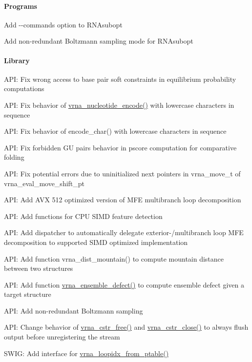 \paragraph*{Programs}


\begin{DoxyItemize}
\item Add {\ttfamily -\/-\/commands} option to {\ttfamily R\+N\+Asubopt}
\item Add non-\/redundant Boltzmann sampling mode for {\ttfamily R\+N\+Asubopt}
\end{DoxyItemize}

\paragraph*{Library}


\begin{DoxyItemize}
\item A\+PI\+: Fix wrong access to base pair soft constraints in equilibrium probability computations
\item A\+PI\+: Fix behavior of {\ttfamily \mbox{\hyperlink{group__alphabet__utils_gac12bf00123f88621c9be847b0879c1fb}{vrna\+\_\+nucleotide\+\_\+encode()}}} with lowercase characters in sequence
\item A\+PI\+: Fix behavior of {\ttfamily encode\+\_\+char()} with lowercase characters in sequence
\item A\+PI\+: Fix forbidden {\ttfamily GU} pairs behavior in pscore computation for comparative folding
\item A\+PI\+: Fix potential errors due to uninitialized {\ttfamily next} pointers in {\ttfamily vrna\+\_\+move\+\_\+t} of {\ttfamily vrna\+\_\+eval\+\_\+move\+\_\+shift\+\_\+pt}
\item A\+PI\+: Add {\ttfamily A\+VX 512} optimized version of M\+FE multibranch loop decomposition
\item A\+PI\+: Add functions for C\+PU S\+I\+MD feature detection
\item A\+PI\+: Add dispatcher to automatically delegate exterior-\//multibranch loop M\+FE decomposition to supported S\+I\+MD optimized implementation
\item A\+PI\+: Add function {\ttfamily vrna\+\_\+dist\+\_\+mountain()} to compute mountain distance between two structures
\item A\+PI\+: Add function {\ttfamily \mbox{\hyperlink{group__part__func__global_gaaf197722d1faa86af5e7b4240acafdee}{vrna\+\_\+ensemble\+\_\+defect()}}} to compute ensemble defect given a target structure
\item A\+PI\+: Add non-\/redundant Boltzmann sampling
\item A\+PI\+: Change behavior of {\ttfamily \mbox{\hyperlink{group__buffer__utils_ga7ec48ec280f699928c70428cc245dc77}{vrna\+\_\+cstr\+\_\+free()}}} and {\ttfamily \mbox{\hyperlink{group__buffer__utils_ga5a3f6a0a73b3d2d38fe011cdaed0ad28}{vrna\+\_\+cstr\+\_\+close()}}} to always flush output before unregistering the stream
\item S\+W\+IG\+: Add interface for {\ttfamily \mbox{\hyperlink{group__struct__utils_ga03e15af299be0866ff21da880c74b92e}{vrna\+\_\+loopidx\+\_\+from\+\_\+ptable()}}}
\end{DoxyItemize}

